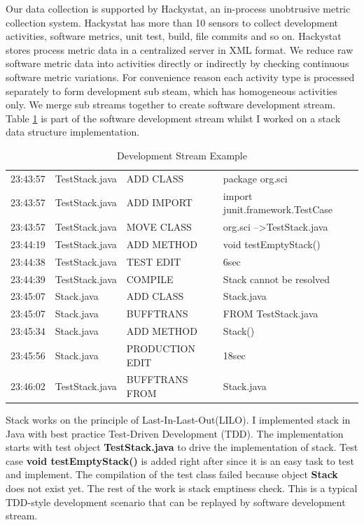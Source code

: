 Our data collection is supported by Hackystat, an in-process unobtrusive
metric collection system. Hackystat has more than 10 sensors to collect
development activities, software metrics, unit test, build, file commits
and so on. Hackystat stores process metric data in a centralized server in
XML format. We reduce raw software metric data into activities directly or
indirectly by checking continuous software metric variations. For
convenience reason each activity type is processed separately to form
development sub steam, which has homogeneous activities only. We merge sub
streams together to create software development stream.  Table
\ref{tab:stackstream} is part of the software development stream whilst I
worked on a stack data structure implementation.
\begin{table}[!h]
\centering
  \begin{tabular}{|llll|}
  \hline
    23:43:57 & TestStack.java & ADD CLASS & package org.sci \\
    23:43:57 & TestStack.java & ADD IMPORT & import junit.framework.TestCase \\
    23:43:57 & TestStack.java & MOVE CLASS & org.sci --\textgreater TestStack.java \\
    23:44:19 & TestStack.java & ADD METHOD & void testEmptyStack() \\
    23:44:38 & TestStack.java & TEST EDIT & 6sec \\
    23:44:39 & TestStack.java & COMPILE & Stack cannot be resolved \\
    23:45:07 & Stack.java     & ADD CLASS & Stack.java \\
    23:45:07 & Stack.java     & BUFFTRANS & FROM TestStack.java \\
    23:45:34 & Stack.java     & ADD METHOD & Stack() \\
    23:45:56 & Stack.java     & PRODUCTION EDIT & 18sec \\
    23:46:02 & TestStack.java & BUFFTRANS FROM & Stack.java \\
  \hline
  \end{tabular}
  \caption{Development Stream Example}\label{tab:stackstream}  
\end{table}
Stack works on the principle of Last-In-Last-Out(LILO). I implemented stack
in Java with best practice Test-Driven Development (TDD). The
implementation starts with test object \textsf{\textbf{TestStack.java}} to
drive the implementation of stack. Test case \textsf{\textbf{void
    testEmptyStack()}} is added right after since it is an easy task to
test and implement. The compilation of the test class failed because object
\textsf{\textbf{Stack}} does not exist yet. The rest of the work is stack
emptiness check. This is a typical TDD-style development scenario that can
be replayed by software development stream.

